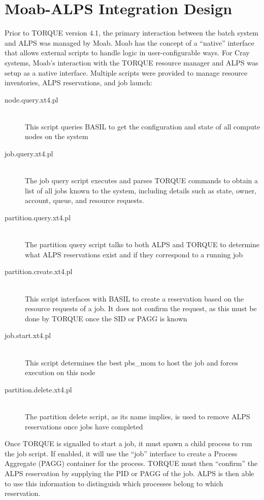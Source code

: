\section{Moab-ALPS Integration Design}

Prior to TORQUE version 4.1, the primary interaction between the batch system
and ALPS was managed by Moab.  Moab has the concept of a ``native'' interface
that allows external scripts to handle logic in user-configurable ways.  For
Cray systems, Moab's interaction with the TORQUE resource manager and ALPS was
setup as a native interface.  Multiple scripts were provided to manage
resource inventories, ALPS reservations, and job launch:

\begin{description}
  \item[node.query.xt4.pl] \hfill \\
    This script queries BASIL to get the configuration and state of all compute
    nodes on the system
  \item[job.query.xt4.pl] \hfill \\
    The job query script executes and parses TORQUE commands to obtain a list
    of all jobs known to the system, including details such as state, owner, 
    account, queue, and resource requests.
  \item[partition.query.xt4.pl] \hfill \\
    The partition query script talks to both ALPS and TORQUE to determine what 
    ALPS reservations exist and if they correspond to a running job
  \item[partition.create.xt4.pl] \hfill \\
    This script interfaces with BASIL to create a reservation based on the 
    resource requests of a job. It does not confirm the request, as this must be
    done by TORQUE once the SID or PAGG is known
  \item[job.start.xt4.pl] \hfill \\
    This script determines the best pbs_mom to host the job and forces execution
    on this node
  \item[partition.delete.xt4.pl] \hfill \\
    The partition delete script, as its name implies, is used to remove ALPS 
    reservations once jobs have completed
\end{description}

Once TORQUE is signalled to start a job, it must spawn a child process to run
the job script.  If enabled, it will use the ``job'' interface to create a
Process Aggregate (PAGG) container for the process.  TORQUE must then
``confirm'' the ALPS reservation by supplying the PID or PAGG of the job.  ALPS
is then able to use this information to distinguish which processes belong to
which reservation.

